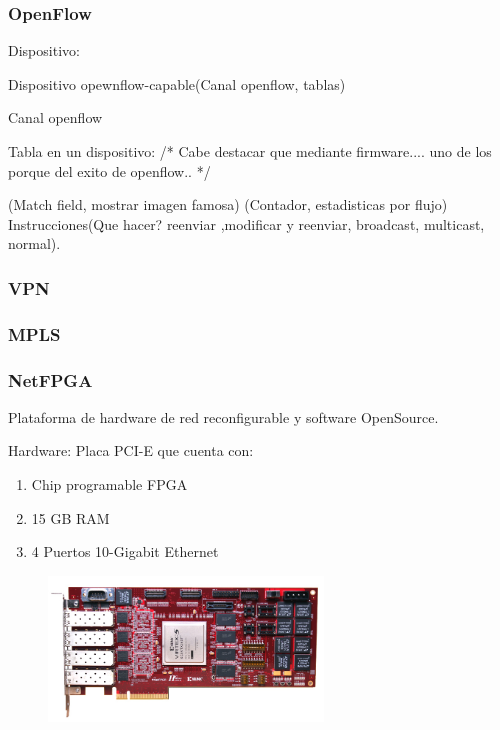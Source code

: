\documentclass{beamer}
\begin{document}
\begin{frame}
\frametitle{OpenFlow} 
Dispositivo:

Dispositivo opewnflow-capable(Canal openflow, tablas)


Canal openflow

Tabla en un dispositivo:    
/*
Cabe destacar que mediante firmware.... uno de los porque del exito de openflow..
*/

(Match field, mostrar imagen famosa)
(Contador, estadisticas por flujo)
Instrucciones(Que hacer? reenviar ,modificar y reenviar, broadcast, multicast, normal).
\end{frame}

\begin{frame}
\frametitle{VPN} 

\end{frame}

\begin{frame}
\frametitle{MPLS} 

\end{frame}


\begin{frame}
\frametitle{NetFPGA} 


	Plataforma de hardware de red reconfigurable y software OpenSource.



		Hardware: Placa PCI-E que cuenta con: 
		\begin{enumerate}
			\item Chip programable FPGA 
			\item 15 GB RAM
			\item 4 Puertos 10-Gigabit Ethernet
		\end{enumerate}
		
	\begin{figure}[H]
		\includegraphics[width=0.65\textwidth, right]{imagenes/NetFPGA10G_web.jpg}
	\end{figure}


\end{frame}
\end{document}
